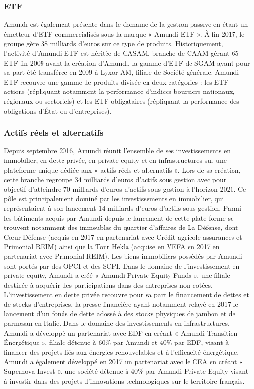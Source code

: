 \subsubsection{ETF}
\par Amundi est également présente dans le domaine de la gestion passive en étant un émetteur d'ETF commercialisés sous la marque « Amundi ETF ». À fin 2017, le groupe gère 38 milliards d'euros sur ce type de produits. Historiquement, l'activité d'Amundi ETF est héritée de CASAM, branche de CAAM gérant 65 ETF fin 2009 avant la création d'Amundi, la gamme d'ETF de SGAM ayant pour sa part été transférée en 2009 à Lyxor AM, filiale de Société générale. Amundi ETF recouvre une gamme de produits divisée en deux catégories : les ETF actions (répliquant notamment la performance d'indices boursiers nationaux, régionaux ou sectoriels) et les ETF obligataires (répliquant la performance des obligations d'État ou d'entreprises).

\subsubsection{Actifs réels et alternatifs}
\par Depuis septembre 2016, Amundi réunit l'ensemble de ses investissements en immobilier, en dette privée, en private equity et en infrastructures sur une plateforme unique dédiée aux « actifs réels et alternatifs ». Lors de sa création, cette branche regroupe 34 milliards d'euros d'actifs sous gestion avec pour objectif d'atteindre 70 milliards d'euros d'actifs sous gestion à l'horizon 2020. Ce pôle est principalement dominé par les investissements en immobilier, qui représentaient à son lancement 14 milliards d'euros d'actifs sous gestion. Parmi les bâtiments acquis par Amundi depuis le lancement de cette plate-forme se trouvent notamment des immeubles du quartier d'affaires de La Défense, dont Cœur Défense (acquis en 2017 en partenariat avec Crédit agricole assurances et Primonial REIM) ainsi que la Tour Hekla (acquise en VEFA en 2017 en partenariat avec Primonial REIM). Les biens immobiliers possédés par Amundi sont portés par des OPCI et des SCPI. Dans le domaine de l'investissement en private equity, Amundi a créé « Amundi Private Equity Funds », une filiale destinée à acquérir des participations dans des entreprises non cotées. L'investissement en dette privée recouvre pour sa part le financement de dettes et de stocks d'entreprises, la presse financière ayant notamment relayé en 2017 le lancement d'un fonds de dette adossé à des stocks physiques de jambon et de parmesan en Italie. Dans le domaine des investissements en infrastructures, Amundi a développé un partenariat avec EDF en créant « Amundi Transition Énergétique », filiale détenue à 60\% par Amundi et 40\% par EDF, visant à financer des projets liés aux énergies renouvelables et à l'efficacité énergétique. Amundi a également développé en 2017 un partenariat avec le CEA en créant « Supernova Invest », une société détenue à 40\% par Amundi Private Equity visant à investir dans des projets d'innovations technologiques sur le territoire français.

